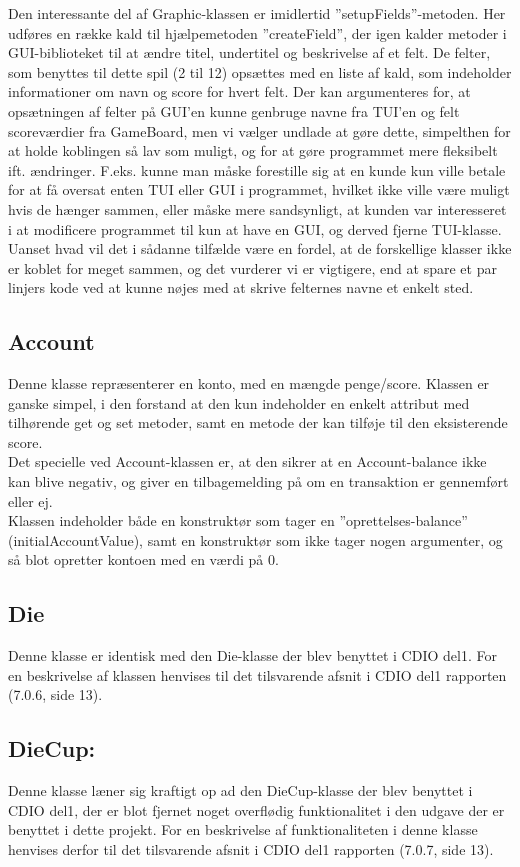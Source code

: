 Den interessante del af Graphic-klassen er imidlertid ”setupFields”-metoden. Her udføres en række kald til hjælpemetoden ”createField”, der igen kalder metoder i GUI-biblioteket til at ændre titel, undertitel og beskrivelse af et felt.
De felter, som benyttes til dette spil (2 til 12) opsættes med en liste af kald, som indeholder informationer om navn og score for hvert felt. Der kan argumenteres for, at opsætningen af felter på GUI’en kunne genbruge navne fra TUI’en og felt scoreværdier fra GameBoard, men vi vælger undlade at gøre dette, simpelthen for at holde koblingen så lav som muligt, og for at gøre programmet mere fleksibelt ift. ændringer.
F.eks. kunne man måske forestille sig at en kunde kun ville betale for at få oversat enten TUI eller GUI i programmet, hvilket ikke ville være muligt hvis de hænger sammen, eller måske mere sandsynligt, at kunden var interesseret i at modificere programmet til kun at have en GUI, og derved fjerne TUI-klasse. Uanset hvad vil det i sådanne tilfælde være en fordel, at de forskellige klasser ikke er koblet for meget sammen, og det vurderer vi er vigtigere, end at spare et par linjers kode ved at kunne nøjes med at skrive felternes navne et enkelt sted.
\subsection{Account}
Denne klasse repræsenterer en konto, med en mængde penge/score. Klassen er ganske simpel, i den forstand at den kun indeholder en enkelt attribut med tilhørende get og set metoder, samt en metode der kan tilføje til den eksisterende score.
\\

Det specielle ved Account-klassen er, at den sikrer at en Account-balance ikke kan blive negativ, og giver en tilbagemelding på om en transaktion er gennemført eller ej.
\\
Klassen indeholder både en konstruktør som tager en ”oprettelses-balance” (initialAccountValue), samt en konstruktør som ikke tager nogen argumenter, og så blot opretter kontoen med en værdi på 0.
\\
\subsection{Die}
Denne klasse er identisk med den Die-klasse der blev benyttet i CDIO del1. For en beskrivelse af klassen henvises til det tilsvarende afsnit i CDIO del1 rapporten (7.0.6, side 13).
\subsection{DieCup:}
Denne klasse læner sig kraftigt op ad den DieCup-klasse der blev benyttet i CDIO del1, der er blot fjernet noget overflødig funktionalitet i den udgave der er benyttet i dette projekt. For en beskrivelse af funktionaliteten i denne klasse henvises derfor til det tilsvarende afsnit i CDIO del1 rapporten (7.0.7, side 13).

